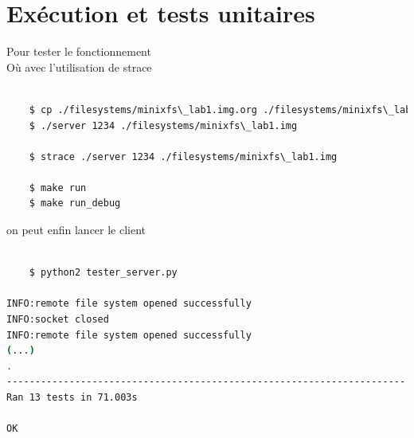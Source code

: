 \documentclass[a4paper,12pt]{article}
\begin{document}
\section{Exécution et tests unitaires}

Pour tester le fonctionnement\\


Où avec l'utilisation de strace

\begin{lstlisting}[language=bash,caption={lancer le server}]

	$ cp ./filesystems/minixfs\_lab1.img.org ./filesystems/minixfs\_lab1.img
	$ ./server 1234 ./filesystems/minixfs\_lab1.img
	
	$ strace ./server 1234 ./filesystems/minixfs\_lab1.img

	$ make run
	$ make run_debug
\end{lstlisting}

on peut enfin lancer le client\\
\begin{lstlisting}[language=bash,caption={lancer le client}]
	
	$ python2 tester_server.py
  
INFO:remote file system opened successfully
INFO:socket closed
INFO:remote file system opened successfully
(...)
.
----------------------------------------------------------------------
Ran 13 tests in 71.003s

OK

\end{lstlisting}

\end{document}
